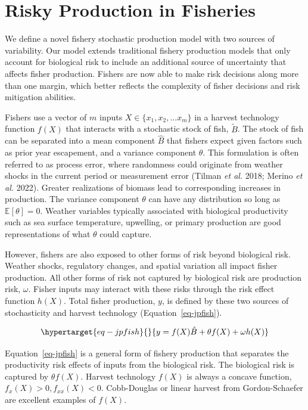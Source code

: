\documentclass[
  letterpaper,
  DIV=11,
  numbers=noendperiod]{scrartcl}
\theoremstyle{plain}
\theoremstyle{plain}
\theoremstyle{remark}
\begin{document}
\hypertarget{sec-jp}{%
\section{Risky Production in Fisheries}\label{sec-jp}}

We define a novel fishery stochastic production model with two sources
of variability. Our model extends traditional fishery production models
that only account for biological risk to include an additional source of
uncertainty that affects fisher production. Fishers are now able to make
risk decisions along more than one margin, which better reflects the
complexity of fisher decisions and risk mitigation abilities.

Fishers use a vector of \(m\) inputs \(X\in\{x_1,x_2,...x_m\}\) in a
harvest technology function \(f(X)\) that interacts with a stochastic
stock of fish, \(\tilde B\). The stock of fish can be separated into a
mean component \(\hat{B}\) that fishers expect given factors such as
prior year escapement, and a variance component \(\theta\). This
formulation is often referred to as process error, where randomness
could originate from weather shocks in the current period or measurement
error (Tilman \emph{et al.} 2018; Merino \emph{et al.} 2022). Greater
realizations of biomass lead to corresponding increases in production.
The variance component \(\theta\) can have any distribution so long as
\(\mathbb{E}[\theta]=0\). Weather variables typically associated with
biological productivity such as sea surface temperature, upwelling, or
primary production are good representations of what \(\theta\) could
capture.

However, fishers are also exposed to other forms of risk beyond
biological risk. Weather shocks, regulatory changes, and spatial
variation all impact fisher production. All other forms of risk not
captured by biological risk are production risk, \(\omega\). Fisher
inputs may interact with these risks through the risk effect function
\(h(X)\). Total fisher production, \(y\), is defined by these two
sources of stochasticity and harvest technology
(Equation~\ref{eq-jpfish}).

\begin{equation}\protect\hypertarget{eq-jpfish}{}{
y=f(X)\hat{B}+\theta f(X)+\omega h(X)
}\label{eq-jpfish}\end{equation}

Equation~\ref{eq-jpfish} is a general form of fishery production that
separates the productivity risk effects of inputs from the biological
risk. The biological risk is captured by \(\theta f(X)\). Harvest
technology \(f(X)\) is always a concave function,
\(f_x(X)>0,f_{xx}(X)<0\). Cobb-Douglas or linear harvest from
Gordon-Schaefer are excellent examples of \(f(X)\).
\end{document}
